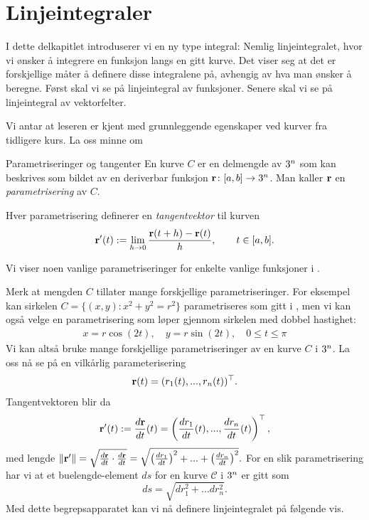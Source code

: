 \section{Linjeintegraler}\label{sect:linint1}

I dette delkapitlet introduserer vi en ny type integral: Nemlig linjeintegralet, hvor vi ønsker å integrere en funksjon langs en gitt kurve. Det viser seg at det er forskjellige måter å definere disse integralene på, avhengig av hva man ønsker å beregne. Først skal vi se på linjeintegral av funksjoner. Senere skal vi se på linjeintegral av vektorfelter.

Vi antar at leseren er kjent med grunnleggende egenskaper ved kurver fra tidligere kurs. La oss minne om
\begin{defn}{Parametriseringer og tangenter}
En kurve $C$ er en delmengde av $3^n$ som kan beskrives som bildet av en deriverbar funksjon $\mathbf{r}\colon [a,b] \rightarrow 3^n$. Man kaller $\mathbf{r}$ en \emph{parametrisering} av $C$.

Hver parametrisering definerer en \emph{tangentvektor} til kurven \[\mathbf{r}'(t):=\lim_{h\rightarrow 0}\frac{\mathbf{r}(t+h)-\mathbf{r}(t)}{h}, \qquad t \in [a,b].\]\label{defn:para_tangent}
\end{defn}
Vi viser noen vanlige parametriseringer for enkelte vanlige funksjoner i . 

Merk at mengden $C$ tillater mange forskjellige parametriseringer. For eksempel kan sirkelen $C=\{(x,y) \colon x^2+y^2 = r^2\}$ parametriseres som gitt i , men vi kan også velge en parametrisering som løper gjennom sirkelen med dobbel hastighet:
\begin{align}\label{para:doublespeed}
x= r\cos (2t), \quad y= r \sin (2t), \quad 0 \leq t \leq \pi
\end{align}
Vi kan altså bruke mange forskjellige parametriseringer av en kurve $C$ i $3^n$. La oss nå se på en vilkårlig parameterisering
\[\mathbf{r}(t)=(r_1(t),..., r_n(t))^\top.\]
Tangentvektoren blir da
\begin{align}\label{tangentvect}\mathbf{r}^\prime(t):=\frac{d\mathbf{r}}{dt}(t)=\left(\frac{dr_1}{dt}(t),...,\frac{dr_n}{dt}(t)\right)^\top,\end{align}
med lengde \(\|\mathbf{r}^\prime\|=\sqrt{\frac{d\mathbf{r}}{dt}\cdot\frac{d\mathbf{r}}{dt}}=\sqrt{\left(\frac{dr_1}{dt}\right)^2+...+\left(\frac{dr_n}{dt}\right)^2}.\)
For en slik parametrisering har vi at et buelengde-element $ds$ for en kurve $\mathcal{C}$ i $3^n$ er gitt som 
\[ds=\sqrt{dr_1^2+...dr_n^2}.\]
Med dette begrepsapparatet kan vi nå definere linjeintegralet på følgende vis.

